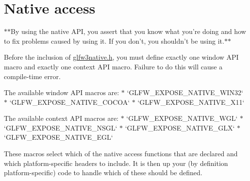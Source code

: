 \hypertarget{group__native}{\section{\-Native access}
\label{group__native}
}
$\ast$$\ast$\-By using the native \-A\-P\-I, you assert that you know what you're doing and how to fix problems caused by using it. \-If you don't, you shouldn't be using it.$\ast$$\ast$

\-Before the inclusion of \hyperlink{glfw3native_8h_source}{glfw3native.\-h}, you must define exactly one window \-A\-P\-I macro and exactly one context \-A\-P\-I macro. \-Failure to do this will cause a compile-\/time error.

\-The available window \-A\-P\-I macros are\-: $\ast$ `\-G\-L\-F\-W\-\_\-\-E\-X\-P\-O\-S\-E\-\_\-\-N\-A\-T\-I\-V\-E\-\_\-\-W\-I\-N32` $\ast$ `\-G\-L\-F\-W\-\_\-\-E\-X\-P\-O\-S\-E\-\_\-\-N\-A\-T\-I\-V\-E\-\_\-\-C\-O\-C\-O\-A` $\ast$ `\-G\-L\-F\-W\-\_\-\-E\-X\-P\-O\-S\-E\-\_\-\-N\-A\-T\-I\-V\-E\-\_\-\-X11`

\-The available context \-A\-P\-I macros are\-: $\ast$ `\-G\-L\-F\-W\-\_\-\-E\-X\-P\-O\-S\-E\-\_\-\-N\-A\-T\-I\-V\-E\-\_\-\-W\-G\-L` $\ast$ `\-G\-L\-F\-W\-\_\-\-E\-X\-P\-O\-S\-E\-\_\-\-N\-A\-T\-I\-V\-E\-\_\-\-N\-S\-G\-L` $\ast$ `\-G\-L\-F\-W\-\_\-\-E\-X\-P\-O\-S\-E\-\_\-\-N\-A\-T\-I\-V\-E\-\_\-\-G\-L\-X` $\ast$ `\-G\-L\-F\-W\-\_\-\-E\-X\-P\-O\-S\-E\-\_\-\-N\-A\-T\-I\-V\-E\-\_\-\-E\-G\-L`

\-These macros select which of the native access functions that are declared and which platform-\/specific headers to include. \-It is then up your (by definition platform-\/specific) code to handle which of these should be defined. 